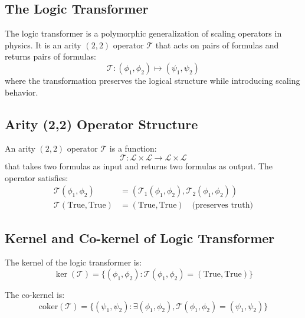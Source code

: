\subsection{The Logic Transformer}

\begin{definition}
\label{def:logic-transformer}
The logic transformer is a polymorphic generalization of scaling operators in physics. It is an arity $(2,2)$ operator $\mathcal{T}$ that acts on pairs of formulas and returns pairs of formulas:
\[
\mathcal{T}: (\phi_1, \phi_2) \mapsto (\psi_1, \psi_2)
\]
where the transformation preserves the logical structure while introducing scaling behavior.
\end{definition}

\subsection{Arity (2,2) Operator Structure}

\begin{definition}
\label{def:arity-2-2-operator}
An arity $(2,2)$ operator $\mathcal{T}$ is a function:
\[
\mathcal{T}: \mathcal{L} \times \mathcal{L} \to \mathcal{L} \times \mathcal{L}
\]
that takes two formulas as input and returns two formulas as output. The operator satisfies:
\begin{align}
\mathcal{T}(\phi_1, \phi_2) &= (\mathcal{T}_1(\phi_1, \phi_2), \mathcal{T}_2(\phi_1, \phi_2)) \\
\mathcal{T}(\text{True}, \text{True}) &= (\text{True}, \text{True}) \quad \text{(preserves truth)}
\end{align}
\end{definition}

\subsection{Kernel and Co-kernel of Logic Transformer}

\begin{definition}
\label{def:kernel-cokernel}
The kernel of the logic transformer is:
\[
\ker(\mathcal{T}) = \{(\phi_1, \phi_2) : \mathcal{T}(\phi_1, \phi_2) = (\text{True}, \text{True})\}
\]

The co-kernel is:
\[
\text{coker}(\mathcal{T}) = \{(\psi_1, \psi_2) : \exists (\phi_1, \phi_2), \mathcal{T}(\phi_1, \phi_2) = (\psi_1, \psi_2)\}
\]
\end{definition}

